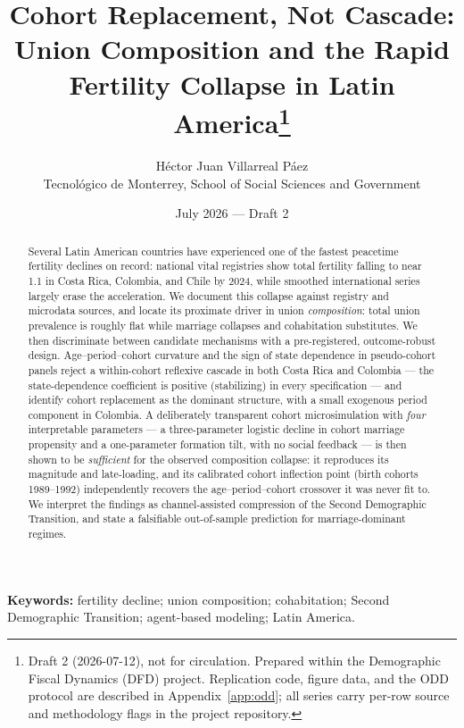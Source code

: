 \documentclass[11pt]{article}
\title{Cohort Replacement, Not Cascade:\\
Union Composition and the Rapid Fertility Collapse in Latin America\thanks{%
Draft 2 (2026-07-12), not for circulation. Prepared within the Demographic Fiscal
Dynamics (DFD) project. Replication code, figure data, and the ODD protocol are
described in Appendix~\ref{app:odd}; all series carry per-row source and methodology
flags in the project repository.}}
\author{H\'ector Juan Villarreal P\'aez\\
\small Tecnol\'ogico de Monterrey, School of Social Sciences and Government
}
\date{July 2026 --- Draft 2}
\begin{document}
\maketitle

\begin{abstract}
\noindent
Several Latin American countries have experienced one of the fastest peacetime
fertility declines on record: national vital registries show total fertility falling
to near 1.1 in Costa Rica, Colombia, and Chile by 2024, while smoothed international
series largely erase the acceleration. We document this collapse against registry and
microdata sources, and locate its proximate driver in union \emph{composition}: total
union prevalence is roughly flat while marriage collapses and cohabitation substitutes.
We then discriminate between candidate mechanisms with a pre-registered,
outcome-robust design. Age--period--cohort curvature and the sign of state dependence
in pseudo-cohort panels reject a within-cohort reflexive cascade in both Costa Rica
and Colombia --- the state-dependence coefficient is positive (stabilizing) in every
specification --- and identify cohort replacement as the dominant structure, with a
small exogenous period component in Colombia. A deliberately transparent
cohort microsimulation with \emph{four} interpretable parameters --- a three-parameter
logistic decline in cohort marriage propensity and a one-parameter formation tilt,
with no social feedback --- is then shown to be \emph{sufficient} for the observed
composition collapse: it reproduces its magnitude and late-loading, and its calibrated
cohort inflection point (birth cohorts 1989--1992) independently recovers the
age--period--cohort crossover it was never fit to. We interpret the findings as
channel-assisted compression of the Second Demographic Transition, and state a
falsifiable out-of-sample prediction for marriage-dominant regimes.
\end{abstract}

\vspace{0.5em}
\noindent\textbf{Keywords:} fertility decline; union composition; cohabitation;
Second Demographic Transition; agent-based modeling; Latin America.









\end{document}
